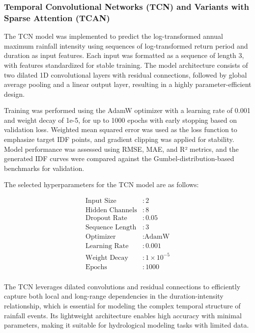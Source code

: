 \subsubsection{Temporal Convolutional Networks (TCN) and Variants with Sparse Attention (TCAN)}

The TCN model was implemented to predict the log-transformed annual maximum rainfall intensity using sequences of log-transformed return period and duration as input features. Each input was formatted as a sequence of length 3, with features standardized for stable training. The model architecture consists of two dilated 1D convolutional layers with residual connections, followed by global average pooling and a linear output layer, resulting in a highly parameter-efficient design.

\vspace{1em}

Training was performed using the AdamW optimizer with a learning rate of 0.001 and weight decay of 1e-5, for up to 1000 epochs with early stopping based on validation loss. Weighted mean squared error was used as the loss function to emphasize target IDF points, and gradient clipping was applied for stability. Model performance was assessed using RMSE, MAE, and R² metrics, and the generated IDF curves were compared against the Gumbel-distribution-based benchmarks for validation.

\vspace{1em}

The selected hyperparameters for the TCN model are as follows:

\begin{align*}
\text{Input Size} &: 2 \\
\text{Hidden Channels} &: 8 \\
\text{Dropout Rate} &: 0.05 \\
\text{Sequence Length} &: 3 \\
\text{Optimizer} &: \text{AdamW} \\
\text{Learning Rate} &: 0.001 \\
\text{Weight Decay} &: 1\times10^{-5} \\
\text{Epochs} &: 1000 \\
\end{align*}

The TCN leverages dilated convolutions and residual connections to efficiently capture both local and long-range dependencies in the duration-intensity relationship, which is essential for modeling the complex temporal structure of rainfall events. Its lightweight architecture enables high accuracy with minimal parameters, making it suitable for hydrological modeling tasks with limited data.

